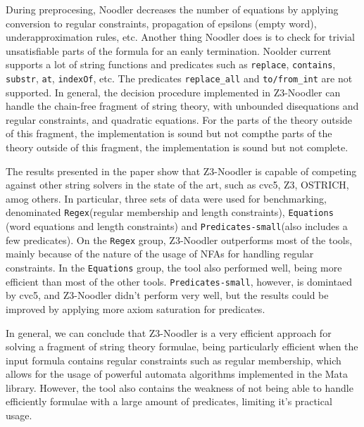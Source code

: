 \documentclass{article}
\begin{document}
During preprocesing, Noodler decreases the number of equations by applying conversion to regular constraints, propagation of epsilons (empty word), underapproximation rules, etc.
Another thing Noodler does is to check for trivial unsatisfiable parts of the formula for an eanly termination. Noolder current supports a lot of
string functions and predicates such as \texttt{replace}, \texttt{contains}, \texttt{substr}, \texttt{at}, \texttt{indexOf}, etc. The predicates \texttt{replace\_all} and
\texttt{to/from\_int} are not supported. In general, the decision procedure implemented in Z3-Noodler can handle the chain-free fragment of string theory, with unbounded
disequations and regular constraints, and quadratic equations. For the parts of the theory outside of this fragment, the implementation is sound but not compthe parts of the theory outside of this fragment, the implementation is sound but not complete.

The results presented in the paper show that Z3-Noodler is capable of competing against other string solvers in the state of the art, such as cvc5, Z3, OSTRICH, amog others. In particular, three sets of data were used for benchmarking, denominated \texttt{Regex}(regular membership and length constraints), \texttt{Equations} (word equations and length constraints) and \texttt{Predicates-small}(also includes a few predicates). On the \texttt{Regex} group, Z3-Noodler outperforms most of the tools, mainly because of the nature of the usage of NFAs for handling regular constraints. In the \texttt{Equations} group, the tool also performed well, being more efficient than most of the other tools. \texttt{Predicates-small}, however, is domintaed by cvc5, and Z3-Noodler didn't perform very well, but the results could be improved by applying more axiom saturation for predicates.

In general, we can conclude that Z3-Noodler is a very efficient approach for solving a fragment of string theory formulae, being particularly efficient when the input formula contains regular constraints such as regular membership, which allows for the usage of powerful automata algorithms implemented in the Mata library. However, the tool also contains the weakness of not being able to handle efficiently formulae with a large amount of predicates, limiting it's practical usage.
\end{document}
